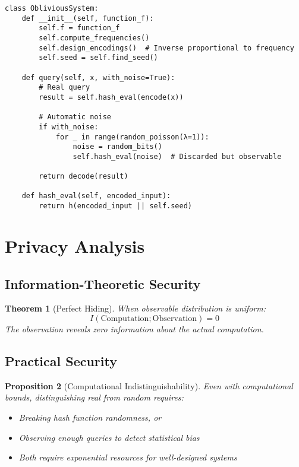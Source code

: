 \documentclass[11pt,final,hidelinks]{article}
\newtheorem{theorem}{Theorem}[section]
\newtheorem{proposition}[theorem]{Proposition}
\begin{document}
\begin{verbatim}
class ObliviousSystem:
    def __init__(self, function_f):
        self.f = function_f
        self.compute_frequencies()
        self.design_encodings()  # Inverse proportional to frequency
        self.seed = self.find_seed()
        
    def query(self, x, with_noise=True):
        # Real query
        result = self.hash_eval(encode(x))
        
        # Automatic noise
        if with_noise:
            for _ in range(random_poisson(λ=1)):
                noise = random_bits()
                self.hash_eval(noise)  # Discarded but observable
                
        return decode(result)
        
    def hash_eval(self, encoded_input):
        return h(encoded_input || self.seed)
\end{verbatim}

\section{Privacy Analysis}

\subsection{Information-Theoretic Security}

\begin{theorem}[Perfect Hiding]
When observable distribution is uniform:
\begin{equation}
I(\text{Computation}; \text{Observation}) = 0
\end{equation}
The observation reveals zero information about the actual computation.
\end{theorem}

\subsection{Practical Security}

\begin{proposition}[Computational Indistinguishability]
Even with computational bounds, distinguishing real from random requires:
\begin{itemize}
    \item Breaking hash function randomness, or
    \item Observing enough queries to detect statistical bias
    \item Both require exponential resources for well-designed systems
\end{itemize}
\end{proposition}
\end{document}
